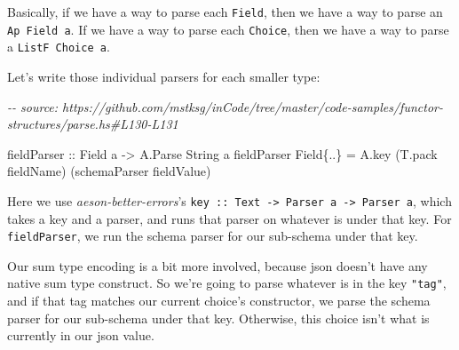 \documentclass[]{article}
\newenvironment{Shaded}{}{}
\newcommand{\CommentTok}[1]{\textcolor[rgb]{0.38,0.63,0.69}{\textit{#1}}}
\newcommand{\DataTypeTok}[1]{\textcolor[rgb]{0.56,0.13,0.00}{#1}}
\newcommand{\KeywordTok}[1]{\textcolor[rgb]{0.00,0.44,0.13}{\textbf{#1}}}
\newcommand{\NormalTok}[1]{#1}
\newcommand{\OperatorTok}[1]{\textcolor[rgb]{0.40,0.40,0.40}{#1}}
\newcommand{\OtherTok}[1]{\textcolor[rgb]{0.00,0.44,0.13}{#1}}
\newcommand{\StringTok}[1]{\textcolor[rgb]{0.25,0.44,0.63}{#1}}
\begin{document}
Basically, if we have a way to parse each \texttt{Field}, then we have a way to
parse an \texttt{Ap\ Field\ a}. If we have a way to parse each \texttt{Choice},
then we have a way to parse a \texttt{ListF\ Choice\ a}.

Let's write those individual parsers for each smaller type:

\begin{Shaded}
\begin{Highlighting}[]
\CommentTok{{-}{-} source: https://github.com/mstksg/inCode/tree/master/code{-}samples/functor{-}structures/parse.hs\#L130{-}L131}

\OtherTok{fieldParser ::} \DataTypeTok{Field}\NormalTok{ a }\OtherTok{{-}>} \DataTypeTok{A.Parse} \DataTypeTok{String}\NormalTok{ a}
\NormalTok{fieldParser }\DataTypeTok{Field}\NormalTok{\{}\OperatorTok{..}\NormalTok{\} }\OtherTok{=}\NormalTok{ A.key (T.pack fieldName) (schemaParser fieldValue)}
\end{Highlighting}
\end{Shaded}

Here we use \emph{aeson-better-errors}'s
\texttt{key\ ::\ Text\ -\textgreater{}\ Parser\ a\ -\textgreater{}\ Parser\ a},
which takes a key and a parser, and runs that parser on whatever is under that
key. For \texttt{fieldParser}, we run the schema parser for our sub-schema under
that key.

\begin{Shaded}
\end{Shaded}

Our sum type encoding is a bit more involved, because json doesn't have any
native sum type construct. So we're going to parse whatever is in the key
\texttt{"tag"}, and if that tag matches our current choice's constructor, we
parse the schema parser for our sub-schema under that key. Otherwise, this
choice isn't what is currently in our json value.
\end{document}
